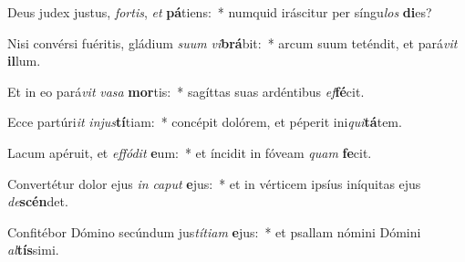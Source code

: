 \item Deus judex justus, \textit{for}\textit{tis}, \textit{et} \textbf{pá}tiens:~* numquid iráscitur per síngu\textit{los} \textbf{di}es?
\item Nisi convérsi fuéritis, gládium \textit{su}\textit{um} \textit{vi}\textbf{brá}bit:~* arcum suum teténdit, et pará\textit{vit} \textbf{il}lum.
\item Et in eo pará\textit{vit} \textit{va}\textit{sa} \textbf{mor}tis:~* sagíttas suas ardéntibus \textit{ef}\textbf{fé}cit.
\item Ecce partúri\textit{it} \textit{in}\textit{jus}\textbf{tí}tiam:~* concépit dolórem, et péperit ini\textit{qui}\textbf{tá}tem.
\item Lacum apéruit, et \textit{ef}\textit{fó}\textit{dit} \textbf{e}um:~* et íncidit in fóveam \textit{quam} \textbf{fe}cit.
\item Convertétur dolor ejus \textit{in} \textit{ca}\textit{put} \textbf{e}jus:~* et in vérticem ipsíus iníquitas ejus \textit{de}\textbf{scén}det.
\item Confitébor Dómino secúndum jus\textit{tí}\textit{ti}\textit{am} \textbf{e}jus:~* et psallam nómini Dómini \textit{al}\textbf{tís}simi.
